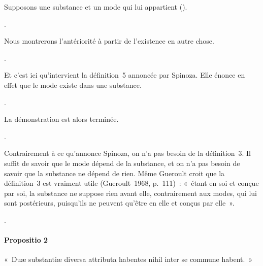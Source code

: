 \documentclass[12pt]{report}
\begin{document}
 Supposons une substance  et un mode  qui lui appartient
    (). \begin{coqdoccode}
\coqdocemptyline
\coqdocindent{2.00em}
   .\coqdoceol
\coqdocemptyline
\end{coqdoccode}
Nous montrerons l'antériorité à partir de l'existence en autre
    chose. \begin{coqdoccode}
\coqdocemptyline
\coqdocindent{2.00em}
 .\coqdoceol
\coqdocemptyline
\end{coqdoccode}
Et c'est ici qu'intervient la définition 5 annoncée par Spinoza.
    Elle énonce en effet que le mode existe dans une substance. \begin{coqdoccode}
\coqdocemptyline
\coqdocindent{2.00em}
 .\coqdoceol
\coqdocemptyline
\end{coqdoccode}
La démonstration est alors terminée. \begin{coqdoccode}
\coqdocemptyline
\coqdocindent{2.00em}
 .\coqdoceol
\coqdocemptyline
\end{coqdoccode}
Contrairement à ce qu'annonce Spinoza, on n'a pas besoin de la
  définition 3. Il suffit de savoir que le mode dépend de la substance,
  et on n'a pas besoin de savoir que la substance ne dépend de rien.
  Même Gueroult croit que la définition 3 est vraiment utile
  (Gueroult 1968, p. 111) : « étant en soi et conçue par soi, la
  substance ne suppose rien avant elle, contrairement aux modes, qui lui
  sont postérieurs, puisqu'ils ne peuvent qu'être en elle et conçus par
  elle ». \begin{coqdoccode}
\coqdocemptyline
\coqdocindent{1.00em}
.\coqdoceol
\coqdocemptyline
\end{coqdoccode}
\paragraph{Propositio 2}

 « Duæ substantiæ diversa attributa habentes nihil inter se commune
  habent. » 
\end{document}
